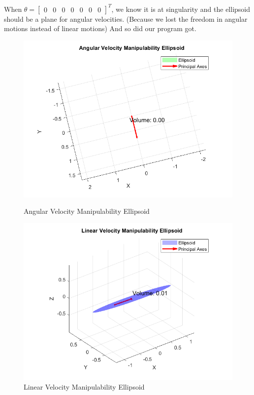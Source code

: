 \documentclass[english,10pt,a4paper]{article}
\begin{document}
    When $\theta = \begin{bmatrix}
        0 & 0 & 0 & 0 & 0 & 0 & 0
    \end{bmatrix}^T$, we know it is at singularity and the ellipsoid should be a plane for angular velocities. (Because we lost the freedom in angular motions instead of linear motions) And so did our program got.
    \begin{figure}[H]
        \centering
        \begin{minipage}{0.45\textwidth}
            \centering
            \includegraphics[width=\textwidth]{pga1a.png} %
            \caption{Angular Velocity Manipulability Ellipsoid}
            \label{fig:pga1a}
        \end{minipage}
        \hfill
        \begin{minipage}{0.45\textwidth}
        \centering
            \includegraphics[width=\textwidth]{pga1l.png} %
            \caption{Linear Velocity Manipulability Ellipsoid}
            \label{fig:pga1l}
        \end{minipage}
    \end{figure}
\end{document}
